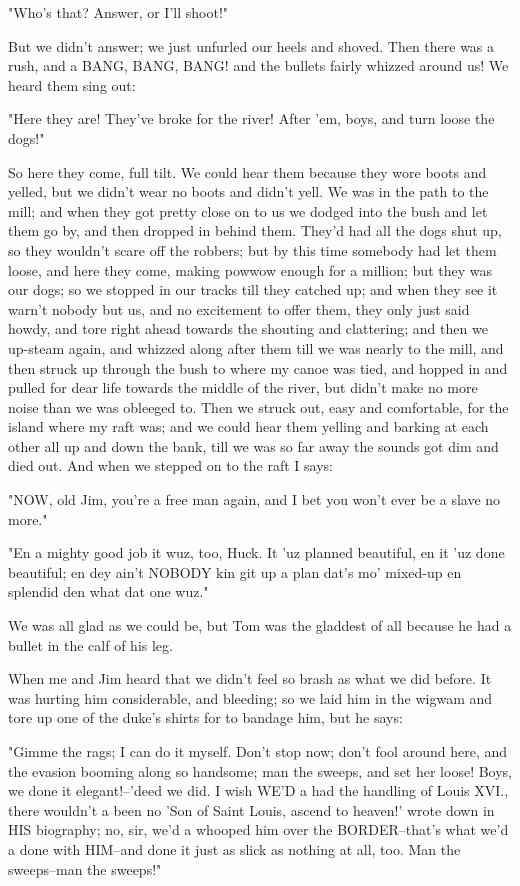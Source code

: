 "Who's that?  Answer, or I'll shoot!"

But we didn't answer; we just unfurled our heels and shoved.  Then there
was a rush, and a BANG, BANG, BANG! and the bullets fairly whizzed around
us! We heard them sing out:

"Here they are!  They've broke for the river!  After 'em, boys, and turn
loose the dogs!"

So here they come, full tilt.  We could hear them because they wore boots
and yelled, but we didn't wear no boots and didn't yell.  We was in the
path to the mill; and when they got pretty close on to us we dodged into
the bush and let them go by, and then dropped in behind them.  They'd had
all the dogs shut up, so they wouldn't scare off the robbers; but by this
time somebody had let them loose, and here they come, making powwow
enough for a million; but they was our dogs; so we stopped in our tracks
till they catched up; and when they see it warn't nobody but us, and no
excitement to offer them, they only just said howdy, and tore right ahead
towards the shouting and clattering; and then we up-steam again, and
whizzed along after them till we was nearly to the mill, and then struck
up through the bush to where my canoe was tied, and hopped in and pulled
for dear life towards the middle of the river, but didn't make no more
noise than we was obleeged to. Then we struck out, easy and comfortable,
for the island where my raft was; and we could hear them yelling and
barking at each other all up and down the bank, till we was so far away
the sounds got dim and died out.  And when we stepped on to the raft I
says:

"NOW, old Jim, you're a free man again, and I bet you won't ever be a
slave no more."

"En a mighty good job it wuz, too, Huck.  It 'uz planned beautiful, en it
'uz done beautiful; en dey ain't NOBODY kin git up a plan dat's mo'
mixed-up en splendid den what dat one wuz."

We was all glad as we could be, but Tom was the gladdest of all because
he had a bullet in the calf of his leg.

When me and Jim heard that we didn't feel so brash as what we did before.
It was hurting him considerable, and bleeding; so we laid him in the
wigwam and tore up one of the duke's shirts for to bandage him, but he
says:

"Gimme the rags; I can do it myself.  Don't stop now; don't fool around
here, and the evasion booming along so handsome; man the sweeps, and set
her loose!  Boys, we done it elegant!--'deed we did.  I wish WE'D a had
the handling of Louis XVI., there wouldn't a been no 'Son of Saint Louis,
ascend to heaven!' wrote down in HIS biography; no, sir, we'd a whooped
him over the BORDER--that's what we'd a done with HIM--and done it just
as slick as nothing at all, too.  Man the sweeps--man the sweeps!"

